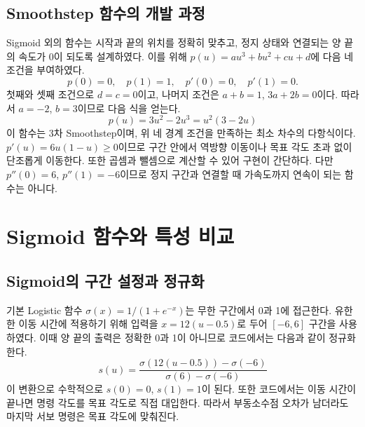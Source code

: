 \documentclass[a4paper,10pt]{article}
\begin{document}
\subsection{Smoothstep 함수의 개발 과정}
Sigmoid 외의 함수는 시작과 끝의 위치를 정확히 맞추고, 정지 상태와 연결되는
양 끝의 속도가 0이 되도록 설계하였다. 이를 위해
$p(u)=au^3+bu^2+cu+d$에 다음 네 조건을 부여하였다.
\begin{equation}
p(0)=0,\quad p(1)=1,\quad p'(0)=0,\quad p'(1)=0.
\end{equation}
첫째와 셋째 조건으로 $d=c=0$이고, 나머지 조건은 $a+b=1$,
$3a+2b=0$이다. 따라서 $a=-2$, $b=3$이므로 다음 식을 얻는다.
\begin{equation}
\boxed{p(u)=3u^2-2u^3=u^2(3-2u)}
\end{equation}
이 함수는 3차 Smoothstep이며, 위 네 경계 조건을 만족하는 최소 차수의 다항식이다.
$p'(u)=6u(1-u)\geq0$이므로 구간 안에서 역방향 이동이나 목표 각도 초과 없이
단조롭게 이동한다. 또한 곱셈과 뺄셈으로 계산할 수 있어 구현이 간단하다.
다만 $p''(0)=6$, $p''(1)=-6$이므로 정지 구간과 연결할 때 가속도까지
연속이 되는 함수는 아니다.

\newpage
\section{Sigmoid 함수와 특성 비교}
\subsection{Sigmoid의 구간 설정과 정규화}
기본 Logistic 함수 $\sigma(x)=1/(1+e^{-x})$는 무한 구간에서 0과 1에 접근한다.
유한한 이동 시간에 적용하기 위해 입력을 $x=12(u-0.5)$로 두어
$[-6,6]$ 구간을 사용하였다. 이때 양 끝의 출력은 정확한 0과 1이 아니므로
코드에서는 다음과 같이 정규화한다.
\begin{equation}
\boxed{s(u)=\frac{\sigma(12(u-0.5))-\sigma(-6)}{\sigma(6)-\sigma(-6)}}
\end{equation}
이 변환으로 수학적으로 $s(0)=0$, $s(1)=1$이 된다.
또한 코드에서는 이동 시간이 끝나면 명령 각도를 목표 각도로 직접 대입한다.
따라서 부동소수점 오차가 남더라도 마지막 서보 명령은 목표 각도에 맞춰진다.
\end{document}

